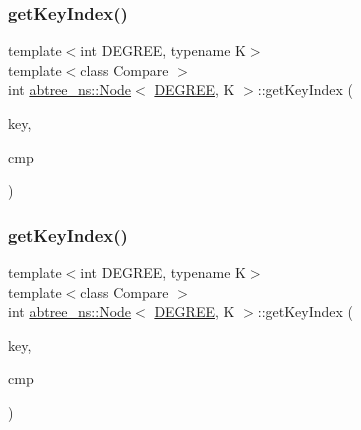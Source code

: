 \subsubsection{\texorpdfstring{get\+Key\+Index()}{getKeyIndex()}\hspace{0.1cm}{\footnotesize\ttfamily [1/2]}}
{\footnotesize\ttfamily template$<$int D\+E\+G\+R\+EE, typename K$>$ \\
template$<$class Compare $>$ \\
int \hyperlink{structabtree__ns_1_1Node}{abtree\+\_\+ns\+::\+Node}$<$ \hyperlink{brown__sigouin__abtree__kcas_2adapter_8h_a5d88b17d70c985f2f2b8e987037fd6dd}{D\+E\+G\+R\+EE}, K $>$\+::get\+Key\+Index (\begin{DoxyParamCaption}\item[{const K \&}]{key,  }\item[{Compare}]{cmp }\end{DoxyParamCaption})\hspace{0.3cm}{\ttfamily [inline]}}

\mbox{\label{structabtree__ns_1_1Node_a5cf6c8acd36258e0bb925f2ae13ebd80}} 
\subsubsection{\texorpdfstring{get\+Key\+Index()}{getKeyIndex()}\hspace{0.1cm}{\footnotesize\ttfamily [2/2]}}
{\footnotesize\ttfamily template$<$int D\+E\+G\+R\+EE, typename K$>$ \\
template$<$class Compare $>$ \\
int \hyperlink{structabtree__ns_1_1Node}{abtree\+\_\+ns\+::\+Node}$<$ \hyperlink{brown__sigouin__abtree__kcas_2adapter_8h_a5d88b17d70c985f2f2b8e987037fd6dd}{D\+E\+G\+R\+EE}, K $>$\+::get\+Key\+Index (\begin{DoxyParamCaption}\item[{const K \&}]{key,  }\item[{Compare}]{cmp }\end{DoxyParamCaption})\hspace{0.3cm}{\ttfamily [inline]}}

\mbox{\label{structabtree__ns_1_1Node_a09fe5b27e3c537ae628c695e9216b450}} 
